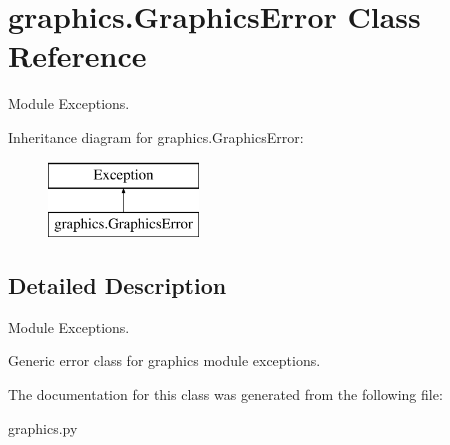 \hypertarget{classgraphics_1_1_graphics_error}{}\section{graphics.\+Graphics\+Error Class Reference}
\label{classgraphics_1_1_graphics_error}


Module Exceptions.  


Inheritance diagram for graphics.\+Graphics\+Error\+:\begin{figure}[H]
\begin{center}
\leavevmode
\includegraphics[height=2.000000cm]{classgraphics_1_1_graphics_error}
\end{center}
\end{figure}


\subsection{Detailed Description}
Module Exceptions. 

\begin{DoxyVerb}Generic error class for graphics module exceptions.\end{DoxyVerb}
 

The documentation for this class was generated from the following file\+:\begin{DoxyCompactItemize}
\item 
graphics.\+py\end{DoxyCompactItemize}

